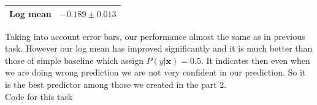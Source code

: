 \documentclass{article}
\newcommand{\vect}[1]{\boldsymbol{#1}} %
\begin{document}
\begin{enumerate}[label=(\alph*)]
\begin{center}
\begin{tabular}{| c | c |}
									\hline
									Log mean & $-0.189 \pm 0.013$\\ 
									\hline
								\end{tabular}
							\end{center}
							Taking into account error bars, our performance almost the same as in previous task. However our log mean has improved significantly and it is much better than those of simple baseline which assign $P(y | \vect{x}) = 0.5$. It indicates then even when we are doing wrong prediction we are not very confident in our prediction. So it is the best predictor among those we created in the part 2.\\
							Code for this task
							
					\end{enumerate}
\end{document}
